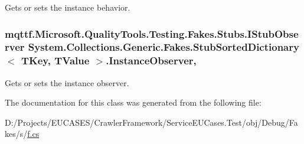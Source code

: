 Gets or sets the instance behavior.

\hypertarget{class_system_1_1_collections_1_1_generic_1_1_fakes_1_1_stub_sorted_dictionary_3_01_t_key_00_01_t_value_01_4_a07bde3676aee9ec543b16005d0ee7f89}{
\subsubsection[{Instance\-Observer}]{\setlength{\rightskip}{0pt plus 5cm}mqttf.\-Microsoft.\-Quality\-Tools.\-Testing.\-Fakes.\-Stubs.\-I\-Stub\-Observer System.\-Collections.\-Generic.\-Fakes.\-Stub\-Sorted\-Dictionary$<$ T\-Key, T\-Value $>$.Instance\-Observer\hspace{0.3cm}{\ttfamily [get]}, {\ttfamily [set]}}}\label{class_system_1_1_collections_1_1_generic_1_1_fakes_1_1_stub_sorted_dictionary_3_01_t_key_00_01_t_value_01_4_a07bde3676aee9ec543b16005d0ee7f89}


Gets or sets the instance observer.



The documentation for this class was generated from the following file\-:\begin{DoxyCompactItemize}
\item 
D\-:/\-Projects/\-E\-U\-C\-A\-S\-E\-S/\-Crawler\-Framework/\-Service\-E\-U\-Cases.\-Test/obj/\-Debug/\-Fakes/s/\hyperlink{s_2f_8cs}{f.\-cs}\end{DoxyCompactItemize}
